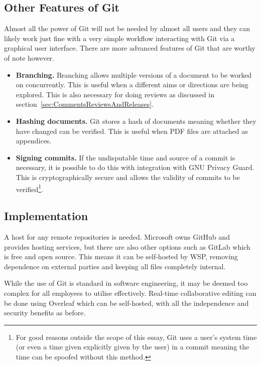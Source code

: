 \subsection{Other Features of Git}

Almost all the power of Git will not be needed by almost all users and they can likely work just fine with a very simple workflow interacting with Git via a graphical user interface. There are more advanced features of Git that are worthy of note however.

\begin{itemize} 
	\item \textbf{Branching.} Branching allows multiple versions of a document to be worked on concurrently. This is useful when a  different aims or directions are being explored. This is also necessary for doing reviews as discussed in section~\ref{sec:CommentsReviewsAndReleases}.
	\item \textbf{Hashing documents.} Git stores a hash of documents meaning whether they have changed can be verified. This is useful when PDF files are attached as appendices.
	\item \textbf{Signing commits.} If the undisputable time and source of a commit is necessary, it is possible to do this with integration with GNU Privacy Guard. This is cryptographically secure and allows the validity of commits to be verified\footnote{For good reasons outside the scope of this essay, Git uses a user's system time (or even a time given explicitly given by the user) in a commit meaning the time can be spoofed without this method.}.
\end{itemize}

\subsection{Implementation}
\label{sec:Implementation}

A host for any remote repositories is needed. Microsoft owns GitHub and provides hosting services, but there are also other options such as GitLab which is free and open source. This means it can be self-hosted by WSP, removing dependence on external parties and keeping all files completely internal.

While the use of Git is standard in software engineering, it may be deemed too complex for all employees to utilise effectively. Real-time collaborative editing can be done using Overleaf which can be self-hosted, with all the independence and security benefits as before.
